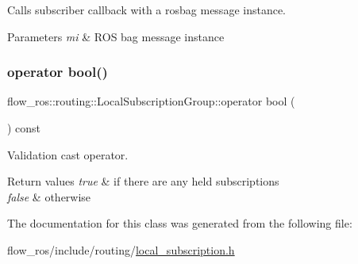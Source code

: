 Calls subscriber callback with a rosbag message instance. 


\begin{DoxyParams}{Parameters}
{\em mi} & R\+OS bag message instance \\
\hline
\end{DoxyParams}
\mbox{\label{classflow__ros_1_1routing_1_1_local_subscription_group_aa63f6c379889d06a99c118d2dc9cdb67}} 
\subsubsection{\texorpdfstring{operator bool()}{operator bool()}}
{\footnotesize\ttfamily flow\+\_\+ros\+::routing\+::\+Local\+Subscription\+Group\+::operator bool (\begin{DoxyParamCaption}{ }\end{DoxyParamCaption}) const\hspace{0.3cm}{\ttfamily [inline]}}



Validation cast operator. 


\begin{DoxyRetVals}{Return values}
{\em true} & if there are any held subscriptions \\
\hline
{\em false} & otherwise \\
\hline
\end{DoxyRetVals}


The documentation for this class was generated from the following file\+:\begin{DoxyCompactItemize}
\item 
flow\+\_\+ros/include/routing/\hyperlink{local__subscription_8h}{local\+\_\+subscription.\+h}\end{DoxyCompactItemize}
